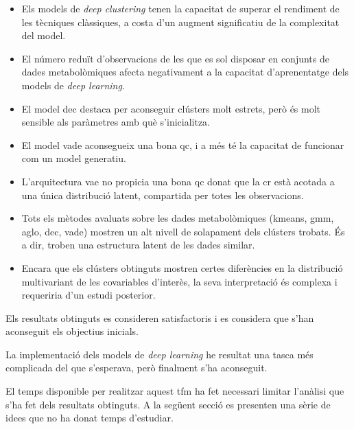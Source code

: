 \documentclass[CAT,BIB]{TFUOC}%
\begin{document}
        \begin{itemize}
            \item Els models de \textit{deep clustering}
            tenen la capacitat de superar el rendiment de les tècniques clàssiques,
            a costa d'un augment significatiu de la complexitat del model.

            \item El número reduït d'observacions de les que es sol disposar
            en conjunts de dades metabolòmiques
            afecta negativament a la capacitat d'aprenentatge
            dels models de \textit{deep learning}.

            \item El model \gls{dec} destaca per aconseguir clústers molt estrets,
            però és molt sensible als paràmetres amb què s'inicialitza.

            \item El model \gls{vade} aconsegueix una bona \gls{qc},
            i a més té la capacitat de funcionar com un model generatiu.

            \item L'arquitectura \gls{vae} no propicia una bona \gls{qc}
            donat que la \gls{cr} està acotada a una única distribució latent,
            compartida per totes les observacions.

            \item Tots els mètodes avaluats sobre les dades metabolòmiques
            (\gls{kmeans}, \gls{gmm}, \gls{aglo}, \gls{dec}, \gls{vade})
            mostren un alt nivell de solapament dels clústers trobats.
            És a dir, troben una estructura latent de les dades similar.

            \item Encara que els clústers obtinguts
            mostren certes diferències en la distribució multivariant
            de les covariables d'interès,
            la seva interpretació és complexa
            i requeriria d'un estudi posterior.
        \end{itemize}

        Els resultats obtinguts es consideren satisfactoris
        i es considera que s'han aconseguit els objectius inicials.

        La implementació dels models de \textit{deep learning}
        he resultat una tasca més complicada del que s'esperava,
        però finalment s'ha aconseguit.

        El temps disponible per realitzar aquest \gls{tfm}
        ha fet necessari limitar l'anàlisi que s'ha fet dels resultats obtinguts.
        A la següent secció es presenten una sèrie de idees
        que no ha donat temps d'estudiar.
\end{document}
